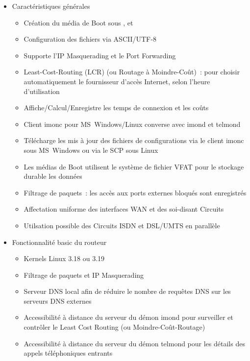 \begin{itemize}
\item Caractéristiques générales

\begin{itemize}
\item Création du média de Boot sous ,
       et
\item Configuration des fichiers via ASCII/UTF-8
\item Supporte l'IP Masquerading et le Port Forwarding
\item Least-Cost-Routing (LCR) (ou Routage à Moindre-Coût)~: pour choisir
      automatiquement le fournisseur d'accès Internet, selon l'heure d'utilisation
\item Affiche/Calcul/Enregistre les temps de connexion et les coûts
\item Client imonc pour MS~Windows/Linux converse avec imond et telmond
\item Télécharge les mis à jour des fichiers de configurations via le client
      imonc sous MS~Windows ou via le SCP sous Linux
\item Les médias de Boot utilisent le système de fichier VFAT pour le stockage
      durable les données
\item Filtrage de paquets~: les accès aux ports externes bloqués sont enregistrés
\item Affectation uniforme des interfaces WAN et des soi-disant Circuits
\item Utilsation possible des Circuits ISDN et DSL/UMTS en parallèle
\end{itemize}

\item Fonctionnalité basic du routeur

\begin{itemize}
\item Kernels Linux 3.18 ou 3.19
\item Filtrage de paquets et IP Masquerading
\item Serveur DNS local afin de réduire le nombre de requêtes DNS sur les serveurs
      DNS externes
\item Accessibilité à distance du serveur du démon imond pour surveiller et
      contrôler le Least Cost Routing (ou Moindre-Coût-Routage)
\item Accessibilité à distance du serveur du démon telmond pour les détails des
      appels téléphoniques entrants
\end{itemize}


\end{itemize}
